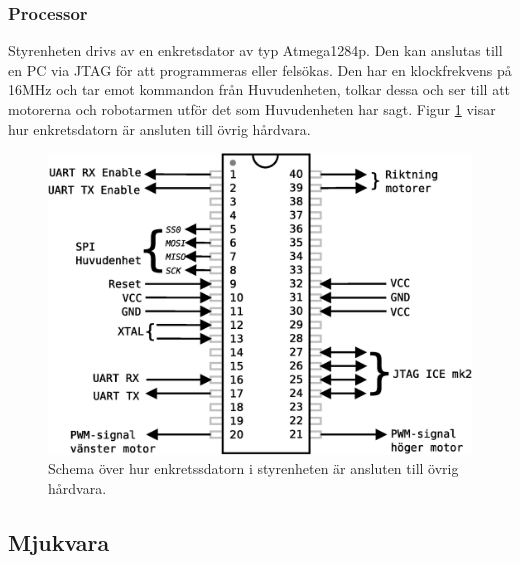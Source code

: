 
\subsubsection{Processor}
Styrenheten drivs av en enkretsdator av typ Atmega1284p. Den kan anslutas till en PC via JTAG för att programmeras eller felsökas. Den har en klockfrekvens på 16MHz och tar emot kommandon från Huvudenheten, tolkar dessa och ser till att motorerna och robotarmen utför det som Huvudenheten har sagt. Figur \ref{styr-processor} visar hur enkretsdatorn är ansluten till övrig hårdvara.

\begin{figure}[h!]
	\centering
	\includegraphics[scale=0.5]{grafik/styrenhet-processor}
	\caption{Schema över hur enkretssdatorn i styrenheten är ansluten till övrig hårdvara.} \label{styr-processor}
\end{figure}

\subsection{Mjukvara}
